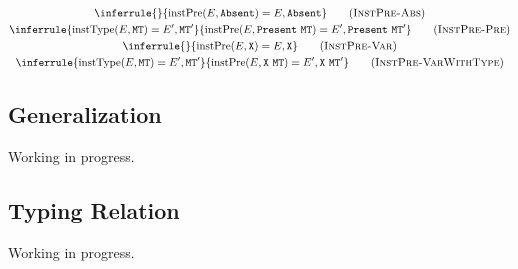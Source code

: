 \documentclass{report}
\newcommand{\code}{\mathtt}
\newcommand{\ruleTag}[1]{\label{#1}\tag{\textsc{#1}}}
\DeclareMathOperator{\instantiateType}{instType}
\DeclareMathOperator{\instantiatePresence}{instPre}
\DeclareMathOperator{\freeVariable}{fv}
\begin{document}
\begin{gather}
\inferrule
{}
{\instantiatePresence(E, \code{Absent}) = E, \code{Absent}}
\ruleTag{InstPre-Abs}
\\
\inferrule
{\instantiateType(E, \code{MT}) = E', \code{MT}'}
{\instantiatePresence(E, \code{Present}\ \code{MT}) = E', \code{Present}\ \code{MT}'}
\ruleTag{InstPre-Pre}
\\
\inferrule
{}
{\instantiatePresence(E, \code{X}) = E, \code{X}}
\ruleTag{InstPre-Var}
\\
\inferrule
{\instantiateType(E, \code{MT}) = E', \code{MT}'}
{\instantiatePresence(E, \code{X}\ \code{MT}) = E', \code{X}\ \code{MT}'}
\ruleTag{InstPre-VarWithType}
\end{gather}

\subsection{Generalization}

Working in progress.


\subsection{Typing Relation}

Working in progress.
\end{document}
